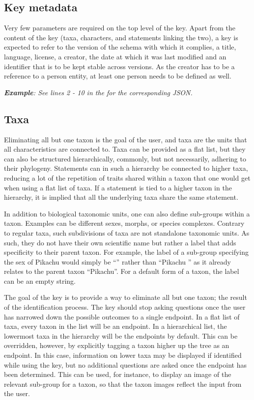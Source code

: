 \documentclass[10pt,letterpaper]{article}
\begin{document}
\subsection*{
Key metadata
}
Very few parameters are required on the top level of the key. Apart from the content of the key (taxa, characters, and statements linking the two), a key is expected to refer to the version of the schema with which it complies, a title, language, license, a creator, the date at which it was last modified and an identifier that is to be kept stable across versions. As the creator has to be a reference to a person entity, at least one person needs to be defined as well.

\textit{\textbf{Example}: See lines 2 - 10 in the  for the corresponding JSON.}

\subsection*{
Taxa
}
Eliminating all but one taxon is the goal of the user, and taxa are the units that all characteristics are connected to. Taxa can be provided as a flat list, but they can also be structured hierarchically, commonly, but not necessarily, adhering to their phylogeny. Statements can in such a hierarchy be connected to higher taxa, reducing a lot of the repetition of traits shared within a taxon that one would get when using a flat list of taxa. If a statement is tied to a higher taxon in the hierarchy, it is implied that all the underlying taxa share the same statement.

In addition to biological taxonomic units, one can also define sub-groups within a taxon. Examples can be different sexes, morphs, or species complexes. Contrary to regular taxa, such subdivisions of taxa are not standalone taxonomic units. As such, they do not have their own scientific name but rather a label that adds specificity to their parent taxon. For example, the label of a sub-group specifying the sex of Pikachu would simply be ``\Female'' rather than ``Pikachu \Female'' as it already relates to the parent taxon ``Pikachu''. For a default form of a taxon, the label can be an empty string.

The goal of the key is to provide a way to eliminate all but one taxon; the result of the identification process.  The key should stop asking questions once the user has narrowed down the possible outcomes to a single endpoint. In a flat list of taxa, every taxon in the list will be an endpoint. In a hierarchical list, the lowermost taxa in the hierarchy will be the endpoints by default. This can be overridden, however, by explicitly tagging a taxon higher up the tree as an endpoint. In this case, information on lower taxa may be displayed if identified while using the key, but no additional questions are asked once the endpoint has been determined. This can be used, for instance, to display an image of the relevant sub-group for a taxon, so that the taxon images reflect the input from the user.
\end{document}
